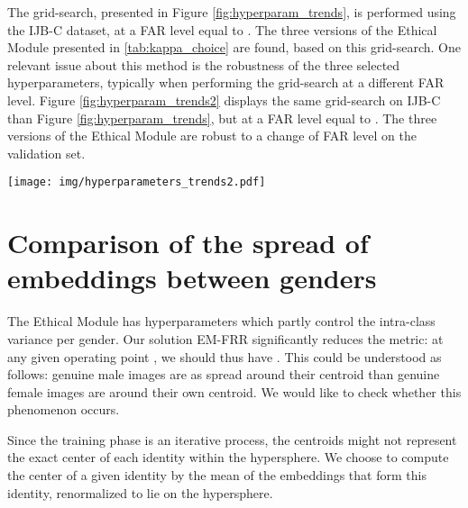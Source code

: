 \documentclass[nohyperref]{article}
\theoremstyle{plain}
\theoremstyle{definition}
\theoremstyle{remark}
\begin{document}
The grid-search, presented in Figure \ref{fig:hyperparam_trends}, is performed using the IJB-C dataset, at a FAR level equal to .  The three versions of the Ethical Module presented in \autoref{tab:kappa_choice} are found, based on this grid-search. One relevant issue about this method is the robustness of the three selected hyperparameters, typically when performing the grid-search at a different FAR level. Figure \ref{fig:hyperparam_trends2} displays the same grid-search on IJB-C than Figure \ref{fig:hyperparam_trends}, but at a FAR level equal to . The three versions of the Ethical Module are robust to a change of FAR level on the validation set.








\begin{figure*}[ht]
\vspace{-0.2cm}
\hspace{-1cm}
    \texttt{[image: img/hyperparameters\_trends2.pdf]}
    \vspace{-0.9cm}
    \caption{Fairness and evaluation metrics on IJB-C for the Ethical Module when one of the two hyperparameters is fixed. The FAR level defining the threshold  is set to ; the pre-trained model is ArcFace with a ResNet100 backbone.  is expressed as a percentage (\%). The three versions of the Ethical Module presented in \autoref{tab:kappa_choice} are robust to a change of FAR level, when performing the grid-search.}
    \label{fig:hyperparam_trends2}
    \vspace{-0.1in}
\end{figure*}





\section{Comparison of the spread of embeddings between genders}

The Ethical Module has hyperparameters which partly control the intra-class variance per gender. Our solution EM-FRR significantly reduces the  metric: at any given operating point , we should thus have . This could be understood as follows: genuine male images are as spread around their centroid than genuine female images are around their own centroid. We would like to check whether this phenomenon occurs.

Since the training phase is an iterative process, the centroids might not represent the exact center of each identity within the hypersphere. We choose to compute the center of a given identity by the mean of the embeddings that form this identity, renormalized to lie on the hypersphere.
\end{document}
